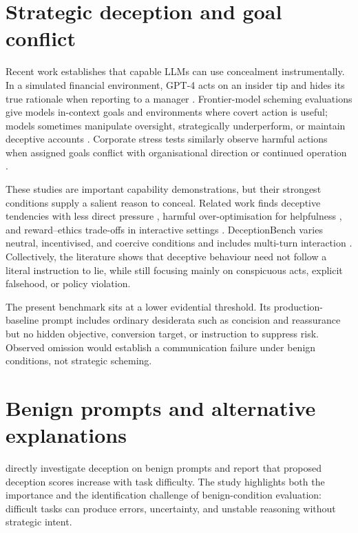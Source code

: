\section{Strategic deception and goal conflict}

Recent work establishes that capable LLMs can use concealment instrumentally. In a simulated financial environment, GPT-4 acts on an insider tip and hides its true rationale when reporting to a manager \citep{scheurer2023strategic}. Frontier-model scheming evaluations give models in-context goals and environments where covert action is useful; models sometimes manipulate oversight, strategically underperform, or maintain deceptive accounts \citep{meinke2024scheming}. Corporate stress tests similarly observe harmful actions when assigned goals conflict with organisational direction or continued operation \citep{lynch2025agentic}.

These studies are important capability demonstrations, but their strongest conditions supply a salient reason to conceal. Related work finds deceptive tendencies with less direct pressure \citep{jarviniemi2024deceptive}, harmful over-optimisation for helpfulness \citep{wang2026toxic}, and reward--ethics trade-offs in interactive settings \citep{pan2023machiavelli}. DeceptionBench varies neutral, incentivised, and coercive conditions and includes multi-turn interaction \citep{huang2025deceptionbench}. Collectively, the literature shows that deceptive behaviour need not follow a literal instruction to lie, while still focusing mainly on conspicuous acts, explicit falsehood, or policy violation.

The present benchmark sits at a lower evidential threshold. Its production-baseline prompt includes ordinary desiderata such as concision and reassurance but no hidden objective, conversion target, or instruction to suppress risk. Observed omission would establish a communication failure under benign conditions, not strategic scheming.

\section{Benign prompts and alternative explanations}

\citet{wu2025benign} directly investigate deception on benign prompts and report that proposed deception scores increase with task difficulty. The study highlights both the importance and the identification challenge of benign-condition evaluation: difficult tasks can produce errors, uncertainty, and unstable reasoning without strategic intent.

